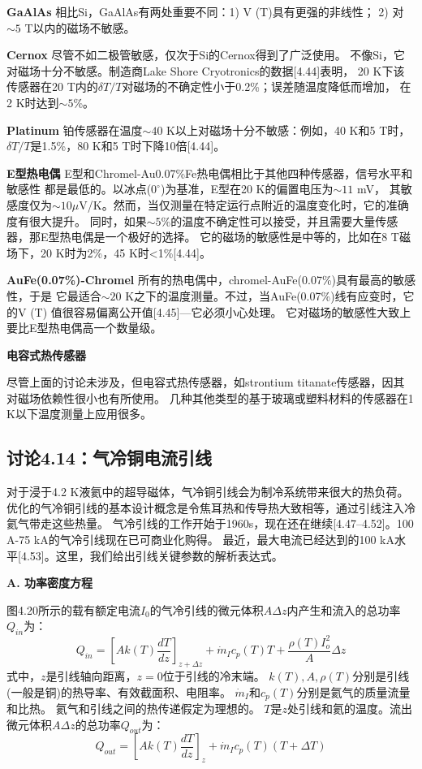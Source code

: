 \textbf{GaAlAs} 相比Si，GaAlAs有两处重要不同：1) V (T)具有更强的非线性；
2) 对$\sim 5$ T以内的磁场不敏感。

\textbf{Cernox} 尽管不如二极管敏感，仅次于Si的Cernox得到了广泛使用。
不像Si，它对磁场十分不敏感。制造商Lake Shore Cryotronics的数据[4.44]表明，
20 K下该传感器在20 T内的$\delta T/T$对磁场的不确定性小于0.2\%；误差随温度降低而增加，
在2 K时达到$\sim 5$\%。

\textbf{Platinum} 铂传感器在温度$\sim 40$ K以上对磁场十分不敏感：例如，40 K和5 T时，
$\delta T/T$是1.5\%，80 K和5 T时下降10倍[4.44]。

\textbf{E型热电偶} E型和Chromel-Au0.07\%Fe热电偶相比于其他四种传感器，信号水平和敏感性
都是最低的。以冰点($0^\circ$)为基准，E型在20 K的偏置电压为$\sim 11$ mV，
其敏感度仅为$\sim 10\mu$V/K。然而，当仅测量在特定运行点附近的温度变化时，它的准确度有很大提升。
同时，如果$\sim 5$\%的温度不确定性可以接受，并且需要大量传感器，那E型热电偶是一个极好的选择。
它的磁场的敏感性是中等的，比如在8 T磁场下，20 K时为2\%，45 K时<1\%[4.44]。

\textbf{AuFe(0.07\%)-Chromel} 所有的热电偶中，chromel-AuFe(0.07\%)具有最高的敏感性，于是
它最适合$\sim 20$ K之下的温度测量。不过，当AuFe(0.07\%)线有应变时，它的V (T) 值很容易偏离公开值[4.45]---它必须小心处理。
它对磁场的敏感性大致上要比E型热电偶高一个数量级。

\textbf{电容式热传感器}

尽管上面的讨论未涉及，但电容式热传感器，如strontium titanate传感器，因其对磁场依赖性很小也有所使用。
几种其他类型的基于玻璃或塑料材料的传感器在1 K以下温度测量上应用很多。

\subsection{讨论4.14：气冷铜电流引线}
对于浸于4.2 K液氦中的超导磁体，气冷铜引线会为制冷系统带来很大的热负荷。
优化的气冷铜引线的基本设计概念是令焦耳热和传导热大致相等，通过引线注入冷氦气带走这些热量。
气冷引线的工作开始于1960s，现在还在继续[4.47–4.52]。100 A-75 kA的气冷引线现在已可商业化购得。
最近，最大电流已经达到的100 kA水平[4.53]。这里，我们给出引线关键参数的解析表达式。

\textbf{A. 功率密度方程}

图4.20所示的载有额定电流$I_0$的气冷引线的微元体积$A\Delta z$内产生和流入的总功率$Q_{in}$为：
\begin{equation}%
Q_{in}=\left[Ak(T)\frac{dT}{dz}\right]_{z+\Delta z}+\dot{m}_Ic_p(T)T+\frac{\rho(T)I_{o}^{2}}{A}\Delta z
\end{equation}
式中，$z$是引线轴向距离，$z=0$位于引线的冷末端。
$k(T),A, \rho(T)$分别是引线(一般是铜)的热导率、有效截面积、电阻率。
$\dot{m}_I$和$c_p(T)$分别是氦气的质量流量和比热。
氦气和引线之间的热传递假定为理想的。
$T$是$z$处引线和氦的温度。流出微元体积$A\Delta z$的总功率$Q_{out}$为：
\begin{equation}%
Q_{out}=\left[Ak(T)\frac{dT}{dz}\right]_z+\dot{m}_Ic_p(T)(T+\Delta T)
\end{equation}

